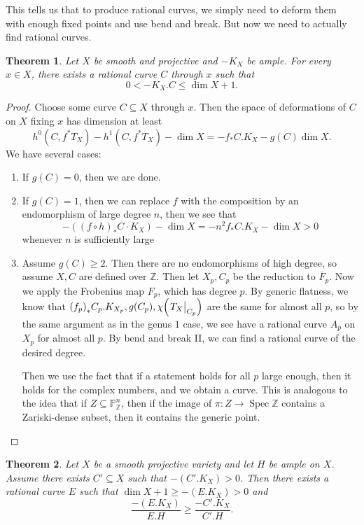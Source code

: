 \documentclass[leqno, openany]{memoir}
\newtheorem{thm}{Theorem}[section]
\theoremstyle{definition}
\theoremstyle{remark}
\theoremstyle{plain}
\theoremstyle{definition}
\theoremstyle{remark}
\newcommand{\Z}{\mathbb{Z}}
\renewcommand{\P}{\mathbb{P}}
\newcommand{\ol}[1]{\overline{#1}}
\DeclareMathOperator{\Spec}{Spec}
\begin{document}
This tells us that to produce rational curves, we simply need to deform them with enough fixed points and use bend and break. But now we need to actually find rational curves.

\begin{thm}
    Let $X$ be smooth and projective and $-K_X$ be ample. For every $x \in X$, there exists a rational curve $C$ through $x$ such that
    \[ 0 < -K_X . C \leq \dim X + 1. \]
\end{thm}

\begin{proof}
    Choose some curve $C \subseteq X$ through $x$. Then the space of deformations of $C$ on $X$ fixing $x$ has dimension at least
    \[ h^0(C, f^* T_X) - h^1(C, f^* T_X) - \dim X = - f_* C. K_X - g(C) \dim X. \]
    We have several cases:
    \begin{enumerate}
        \item If $g(C) = 0$, then we are done.
        \item If $g(C) = 1$, then we can replace $f$ with the composition by an endomorphism of large degree $n$, then we see that
            \[ - ({(f \circ h)}_* C \cdot K_X) - \dim X = -n^2 f_* C.K_X - \dim X > 0 \]
            whenever $n$ is sufficiently large
        \item Assume $g(C) \geq 2$. Then there are no endomorphisms of high degree, so assume $X, C$ are defined over $\Z$. Then let $X_p, C_p$ be the reduction to $\ol{F}_p$. Now we apply the Frobenius map $F_p$, which has degree $p$. By generic flatness, we know that ${(f_p)}_* C_p.K_{X_p}, g(C_p), \chi\qty(\eval{T_X}_{C_p})$ are the same for almost all $p$, so by the same argument as in the genus $1$ case, we see have a rational curve $A_p$ on $X_p$ for almost all $p$. By bend and break II, we can find a rational curve of the desired degree.

            Then we use the fact that if a statement holds for all $p$ large enough, then it holds for the complex numbers, and we obtain a curve. This is analogous to the idea that if $Z \subseteq \P^n_{\Z}$, then if the image of $\pi \colon Z \to \Spec \Z$ contains a Zariski-dense subset, then it contains the generic point. \qedhere
    \end{enumerate}
\end{proof}

\begin{thm}
    Let $X$ be a smooth projective variety and let $H$ be ample on $X$. Assume there exists $C' \subseteq X$ such that $-(C'.K_X) > 0$. Then there exists a rational curve $E$ such that $\dim X + 1 \geq -(E.K_X) > 0$ and
    \[ \frac{-(E.K_X)}{E.H} \geq \frac{-C'.K_X}{C'.H}. \]
\end{thm}
\end{document}
